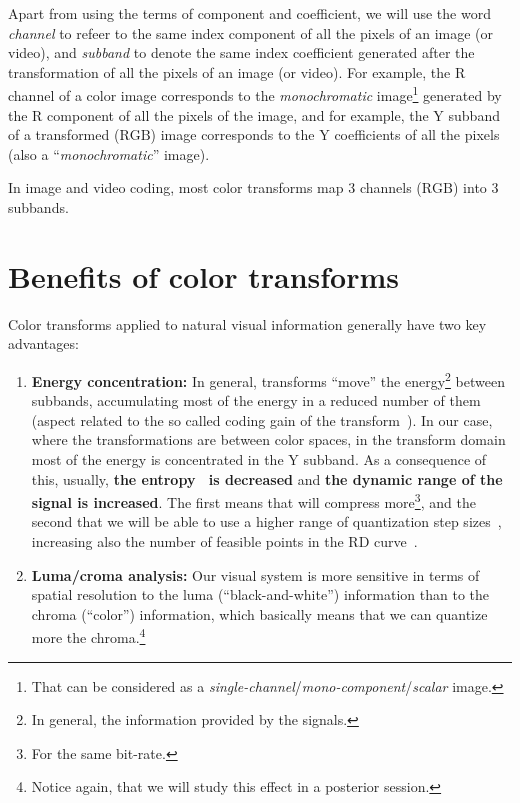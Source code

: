 Apart from using the terms of component and coefficient, we will use
the word \emph{channel} to refeer to the same index component of all
the pixels of an image (or video), and \emph{subband} to denote the
same index coefficient generated after the transformation of all the
pixels of an image (or video). For example, the $\text{R}$ channel of
a color image corresponds to the \emph{monochromatic}
image\footnote{That can be considered as a
  \emph{single-channel}/\emph{mono-component}/\emph{scalar} image.}
generated by the $\text{R}$ component of all the pixels of the image,
and for example, the $\text{Y}$ subband of a transformed
($\text{RGB}$) image corresponds to the $\text{Y}$ coefficients of all
the pixels (also a ``\emph{monochromatic}'' image).

In image and video coding, most color transforms map 3 channels
($\text{RGB}$) into 3 subbands.

\section{Benefits of color transforms}

Color transforms applied to natural visual information generally have
two key advantages:
\begin{enumerate}
\item \textbf{Energy concentration:} In general, transforms ``move''
  the energy\footnote{In general, the information provided by the
    signals.} between subbands, accumulating most of the energy in a
  reduced number of them (aspect related to the so called coding gain
  of the transform~\cite{vruiz__transform_coding}). In our case, where
  the transformations are between color spaces, in the transform
  domain most of the energy is concentrated in the $\text{Y}$
  subband. As a consequence of this, usually, \textbf{the
    entropy~\cite{vruiz__information_theory} is decreased} and
  \textbf{the dynamic range of the signal is increased}. The first
  means that will compress more\footnote{For the same bit-rate.}, and
  the second that we will be able to use a higher range of
  quantization step
  sizes~\cite{vruiz__scalar_quantization,sayood2017introduction},
  increasing also the number of feasible points in the RD
  curve~\cite{vruiz__information_theory}.
\item \textbf{Luma/croma analysis:} Our visual system is more
  sensitive in terms of spatial resolution to the luma
  (``black-and-white'') information than to the chroma (``color'')
  information, which basically means that we can quantize more the
  chroma.\footnote{Notice again, that we will study this effect in a
  posterior session.}
\end{enumerate}

